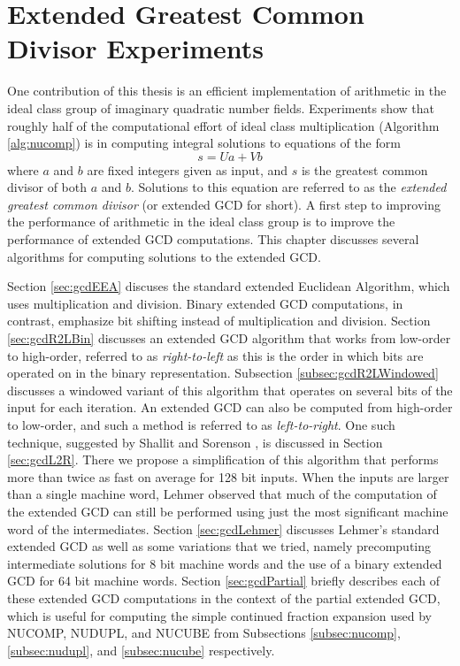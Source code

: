 \documentclass{ucalgthes1}
\theoremstyle{definition}
\begin{document}
\chapter{Extended Greatest Common Divisor Experiments}
\label{chap:xgcdExperiments}

One contribution of this thesis is an efficient implementation of arithmetic in the ideal class group of imaginary quadratic number fields.  Experiments show that roughly half of the computational effort of ideal class multiplication (Algorithm \ref{alg:nucomp}) is in computing integral solutions to equations of the form
\[
	s = Ua + Vb
\]
where $a$ and $b$ are fixed integers given as input, and $s$ is the greatest common divisor of both $a$ and $b$.  Solutions to this equation are referred to as the \emph{extended greatest common divisor} (or extended GCD for short).  A first step to improving the performance of arithmetic in the ideal class group is to improve the performance of extended GCD computations.  This chapter discusses several algorithms for computing solutions to the extended GCD.

Section \ref{sec:gcdEEA} discuses the standard extended Euclidean Algorithm, which uses multiplication and division.  Binary extended GCD computations, in contrast, emphasize bit shifting instead of multiplication and division.  Section \ref{sec:gcdR2LBin} discusses an extended GCD algorithm that works from low-order to high-order, referred to as \emph{right-to-left} as this is the order in which bits are operated on in the binary representation.  Subsection \ref{subsec:gcdR2LWindowed} discusses a windowed variant of this algorithm that operates on several bits of the input for each iteration.  An extended GCD can also be computed from high-order to low-order, and such a method is referred to as \emph{left-to-right}.  One such technique, suggested by Shallit and Sorenson \cite{Shallit1994}, is discussed in Section \ref{sec:gcdL2R}.  There we propose a simplification of this algorithm that performs more than twice as fast on average for 128 bit inputs.  When the inputs are larger than a single machine word, Lehmer \cite{Lehmer1938} observed that much of the computation of the extended GCD can still be performed using just the most significant machine word of the intermediates.  Section \ref{sec:gcdLehmer} discusses Lehmer's standard extended GCD as well as some variations that we tried, namely precomputing intermediate solutions for 8 bit machine words and the use of a binary extended GCD for 64 bit machine words.  Section \ref{sec:gcdPartial} briefly describes each of these extended GCD computations in the context of the partial extended GCD, which is useful for computing the simple continued fraction expansion used by NUCOMP, NUDUPL, and NUCUBE from Subsections \ref{subsec:nucomp}, \ref{subsec:nudupl}, and \ref{subsec:nucube} respectively.
\end{document}
